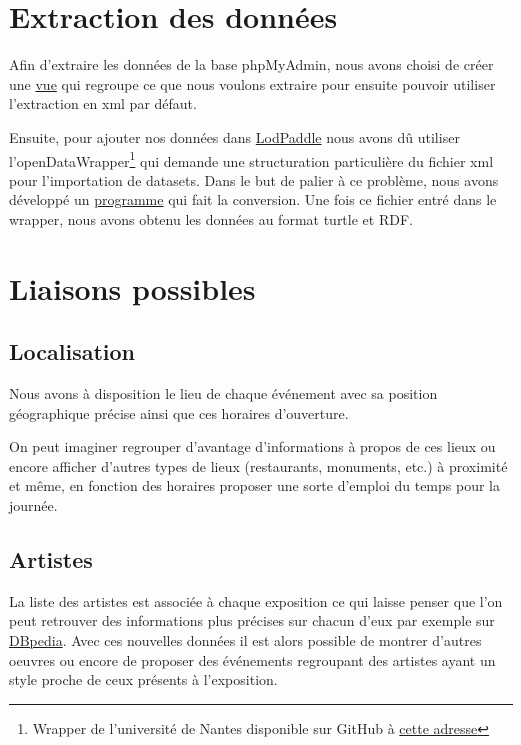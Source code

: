 \documentclass[12pt,a4paper]{article}
\begin{document}
	\section{Extraction des données}	
	Afin d'extraire les données de la base phpMyAdmin, nous avons choisi de créer une \href{http://github.com/masterALMA2016/DataLeReacteur/blob/master/extract/views.sql}{vue} qui regroupe ce que nous voulons extraire pour ensuite pouvoir utiliser l'extraction en xml par défaut. 
	
	
	Ensuite, pour ajouter nos données dans \href{http://lodpaddle.univ-nantes.fr/lodpaddle}{LodPaddle} nous avons dû utiliser l'openDataWrapper\footnote{Wrapper de l'université de Nantes disponible sur GitHub à \href{http://github.com/masterALMA2016/openDataWrapper}{cette adresse}} qui demande une structuration particulière du fichier xml pour l'importation de datasets. Dans le but de palier à ce problème, nous avons développé un \href{http://github.com/masterALMA2016/DataLeReacteur/blob/master/extract/Pma2xml.java}{programme} qui fait la conversion. Une fois ce fichier entré dans le wrapper, nous avons obtenu les données au format turtle et RDF.
	
	\section{Liaisons possibles}
	\subsection{Localisation}
	Nous avons à disposition le lieu de chaque événement avec sa position géographique précise ainsi que ces horaires d'ouverture. 
	
On peut imaginer regrouper d'avantage d'informations à propos de ces lieux ou encore afficher d'autres types de lieux (restaurants, monuments, etc.) à proximité et même, en fonction des horaires proposer une sorte d'emploi du temps pour la journée.
	\subsection{Artistes}
	La liste des artistes est associée à chaque exposition ce qui laisse penser que l'on peut retrouver des informations plus précises sur chacun d'eux par exemple sur \href{http://dbpedia.org}{DBpedia}. Avec ces nouvelles données il est alors possible de montrer d'autres oeuvres ou encore de proposer des événements regroupant des artistes ayant un style proche de ceux présents à l'exposition.
    
\end{document}
